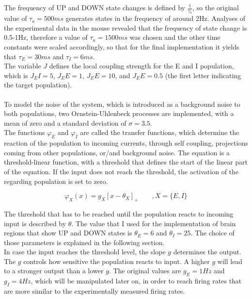 The frequency of UP and DOWN state changes is defined by $\frac{1}{\tau_a}$, so the original value of ${\tau_a=500ms}$ generates states in the frequency of around 2Hz. Analyses of the experimental data in the mouse revealed that the frequency of state change is 0.5-1Hz, therefore a value of $\tau_a=1500ms$ was chosen and the other time constants were scaled accordingly, so that for the final implementation it yields that $\tau_E=30ms$ and $\tau_I=6ms$. 
\\
The variable $J$ defines the local coupling strength for the E and I population, which is $J_EI = 5$, $J_EE = 1$, $J_EE = 10$, and $J_EE = 0.5$ (the first letter indicating the target population).  
\\
\\
\indent To model the noise of the system, which is introduced as a background noise to both populations, two Ornstein-Uhlenbeck processes are implemented, with a mean of zero and a standard deviation of $\sigma=3.5$. 
\\
The functions $\varphi_E$ and $\varphi_I$ are called the transfer functions, which determine the reaction of the population to incoming currents, through self coupling, projections coming from other populations, or/and background noise. The equation is a threshold-linear function, with a threshold that defines the start of the linear part of the equation. If the input does not reach the threshold, the activation of the regarding population is set to zero. 

\begin{equation}\label{eq:4}
    \varphi_X(x) = g_X[x-\theta_X]_+\qquad,X=\{E,I\}
\end{equation}

The threshold that has to be reached until the population reacts to incoming input is described by $\theta$. The value that I used for the implementation of brain regions that show UP and DOWN states is $\theta_E = 6$ and $\theta_I = 25$. The choice of those parameters is explained in the following section.
\\
In case the input reaches the threshold level, the slope $g$ determines the output. The $g$ controls how sensitive the population reacts to input. A higher $g$ will lead to a stronger output than a lower $g$. The original values are $g_E = 1Hz$ and $g_I = 4Hz$, which will be manipulated later on, in order to reach firing rates that are more similar to the experimentally measured firing rates. 
\\


